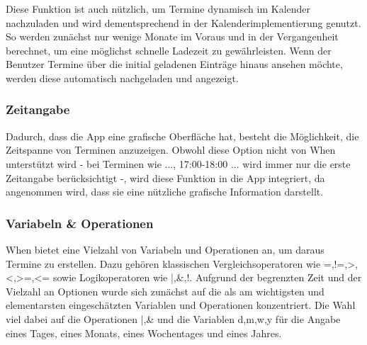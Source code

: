 Diese Funktion ist auch nützlich, um Termine dynamisch im Kalender nachzuladen und wird dementsprechend in der Kalenderimplementierung genutzt. So werden zunächst nur wenige Monate im Voraus und in der Vergangenheit berechnet, um eine möglichst schnelle Ladezeit zu gewährleisten. Wenn der Benutzer Termine über die initial geladenen Einträge hinaus ansehen möchte, werden diese automatisch nachgeladen und angezeigt.%
%
%
%
%
%
\subsubsection{Zeitangabe}
Dadurch, dass die App eine grafische Oberfläche hat, besteht die Möglichkeit, die Zeitspanne von Terminen anzuzeigen. Obwohl diese Option nicht von When unterstützt wird - bei Terminen wie \glqq..., 17:00-18:00 ...\grqq{} wird immer nur die erste Zeitangabe berücksichtigt -, wird diese Funktion in die App integriert, da angenommen wird, dass sie eine nützliche grafische Information darstellt.%
%
%
%
%
%
\subsubsection{Variabeln \& Operationen}
When bietet eine Vielzahl von Variabeln und Operationen an, um daraus Termine zu erstellen. Dazu gehören klassischen Vergleichsoperatoren wie \glqq =,!=,>,<,>=,<=\grqq{} sowie Logikoperatoren wie \glqq|,\&,!\grqq{}. %
Aufgrund der begrenzten Zeit und der Vielzahl an Optionen wurde sich zunächst auf die als am wichtigsten und elementarsten eingeschätzten Variablen und Operationen konzentriert. Die Wahl viel dabei auf die Operationen \glqq|,\&\grqq{} und die Variablen \glqq d,m,w,y\grqq{} für die Angabe eines Tages, eines Monats, eines Wochentages und eines Jahres.%
%
%
%
%
%
